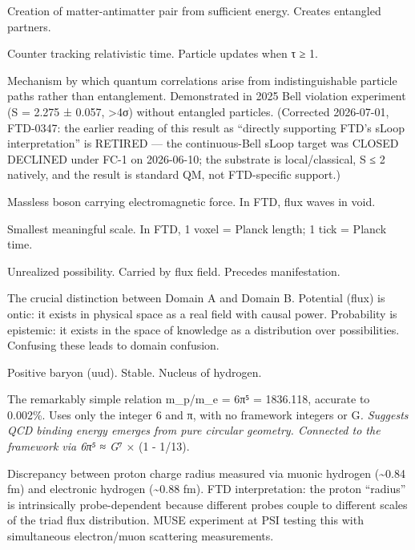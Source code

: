 \documentclass[
  11pt,
  letterpaper,
  twoside,
  openany]{book}
\providecommand{\tightlist}{%
  \setlength{\itemsep}{0pt}\setlength{\parskip}{0pt}}
\begin{document}
\begin{description}
\tightlist
\item[\textbf{Pair Production}]
Creation of matter-antimatter pair from sufficient energy. Creates
entangled partners.
\item[\textbf{Phase Accumulator (τ)}]
Counter tracking relativistic time. Particle updates when τ ≥ 1.
\item[\textbf{Path Identity (Quantum Indistinguishability)}]
Mechanism by which quantum correlations arise from indistinguishable
particle paths rather than entanglement. Demonstrated in 2025 Bell
violation experiment (S = 2.275 ± 0.057, \textgreater4σ) without
entangled particles. (Corrected 2026-07-01, FTD-0347: the earlier
reading of this result as ``directly supporting FTD's sLoop
interpretation'' is RETIRED --- the continuous-Bell sLoop target was
CLOSED DECLINED under FC-1 on 2026-06-10; the substrate is
local/classical, S ≤ 2 natively, and the result is standard QM, not
FTD-specific support.)
\item[\textbf{Photon}]
Massless boson carrying electromagnetic force. In FTD, flux waves in
void.
\item[\textbf{Planck Scale}]
Smallest meaningful scale. In FTD, 1 voxel = Planck length; 1 tick =
Planck time.
\item[\textbf{Potential}]
Unrealized possibility. Carried by flux field. Precedes manifestation.
\item[\textbf{Potential vs Probability}]
The crucial distinction between Domain A and Domain B. Potential (flux)
is ontic: it exists in physical space as a real field with causal power.
Probability is epistemic: it exists in the space of knowledge as a
distribution over possibilities. Confusing these leads to domain
confusion.
\item[\textbf{Proton}]
Positive baryon (uud). Stable. Nucleus of hydrogen.
\item[\textbf{Proton Mass (π Formula)}]
The remarkably simple relation m\_p/m\_e = 6π⁵ = 1836.118, accurate to
0.002\%. Uses only the integer 6 and π, with no framework integers or
G\emph{. Suggests QCD binding energy emerges from pure circular
geometry. Connected to the framework via 6π⁵ ≈ G}⁷ × (1 - 1/13).
\item[\textbf{Proton Radius Puzzle}]
Discrepancy between proton charge radius measured via muonic hydrogen
(\textasciitilde0.84 fm) and electronic hydrogen (\textasciitilde0.88
fm). FTD interpretation: the proton ``radius'' is intrinsically
probe-dependent because different probes couple to different scales of
the triad flux distribution. MUSE experiment at PSI testing this with
simultaneous electron/muon scattering measurements.
\end{description}
\end{document}
